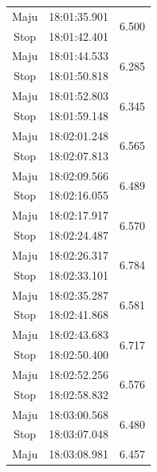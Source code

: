 \begin{longtable}{|c|c|c|}
  Maju           & 18:01:35.901        & \multirow{2}{*}{6.500}  \\ \cline{1-2}
  Stop           & 18:01:42.401        &                         \\ \hline
  Maju           & 18:01:44.533        & \multirow{2}{*}{6.285}  \\ \cline{1-2}
  Stop           & 18:01:50.818        &                         \\ \hline
  Maju           & 18:01:52.803        & \multirow{2}{*}{6.345}  \\ \cline{1-2}
  Stop           & 18:01:59.148        &                         \\ \hline
  Maju           & 18:02:01.248        & \multirow{2}{*}{6.565}  \\ \cline{1-2}
  Stop           & 18:02:07.813        &                         \\ \hline
  Maju           & 18:02:09.566        & \multirow{2}{*}{6.489}  \\ \cline{1-2}
  Stop           & 18:02:16.055        &                         \\ \hline
  Maju           & 18:02:17.917        & \multirow{2}{*}{6.570}  \\ \cline{1-2}
  Stop           & 18:02:24.487        &                         \\ \hline
  Maju           & 18:02:26.317        & \multirow{2}{*}{6.784}  \\ \cline{1-2}
  Stop           & 18:02:33.101        &                         \\ \hline
  Maju           & 18:02:35.287        & \multirow{2}{*}{6.581}  \\ \cline{1-2}
  Stop           & 18:02:41.868        &                         \\ \hline
  Maju           & 18:02:43.683        & \multirow{2}{*}{6.717}  \\ \cline{1-2}
  Stop           & 18:02:50.400        &                         \\ \hline
  Maju           & 18:02:52.256        & \multirow{2}{*}{6.576}  \\ \cline{1-2}
  Stop           & 18:02:58.832        &                         \\ \hline
  Maju           & 18:03:00.568        & \multirow{2}{*}{6.480}  \\ \cline{1-2}
  Stop           & 18:03:07.048        &                         \\ \hline
  Maju           & 18:03:08.981        & \multirow{2}{*}{6.457}  \\ \cline{1-2}

\end{longtable}
